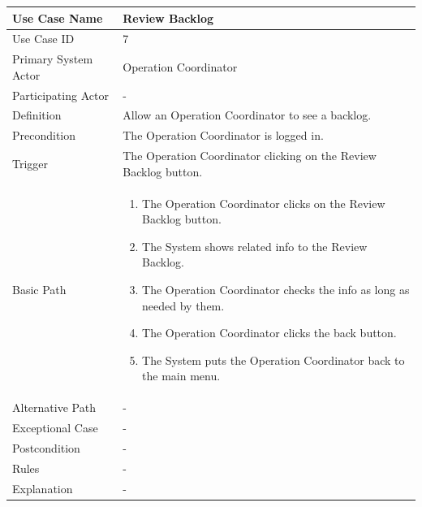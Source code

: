 \documentclass[a4paper,12pt]{report}
\begin{document}
		\begin{tabular}{|m{4cm}|m{11.5cm}|}
			\hline
				Use Case Name & Review Backlog\\
			\hline
				Use Case ID & 7\\
			\hline
				Primary System Actor & Operation Coordinator\\
			\hline
				Participating Actor & -\\
			\hline
				Definition & Allow an Operation Coordinator to see a backlog.\\
			\hline
				Precondition & The Operation Coordinator is logged in.\\
			\hline
				Trigger & The Operation Coordinator clicking on the Review Backlog button.\\
			\hline
				Basic Path & \begin{enumerate}
					\item The Operation Coordinator clicks on the Review Backlog button.
					\item The System shows related info to the Review Backlog.
					\item The Operation Coordinator checks the info as long as needed by them.
					\item The Operation Coordinator clicks the back button.
					\item The System puts the Operation Coordinator back to the main menu.
				\end{enumerate}		
				\\
			\hline
				Alternative Path & -\\
			\hline
				Exceptional Case & -\\
			\hline
				Postcondition & -\\
			\hline
				Rules & -\\
			\hline
				Explanation & -\\
			\hline
		\end{tabular}
\end{document}
